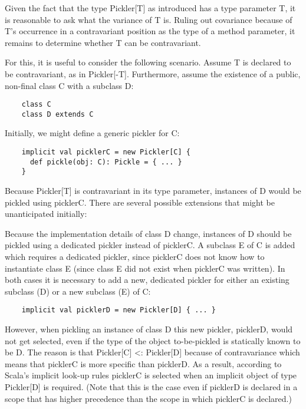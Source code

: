 \documentclass[preprint,10pt]{sigplanconf}
\theoremstyle{definition}
\begin{document}
Given the fact that the type Pickler[T] as introduced has a type parameter T, it is reasonable to ask what the variance of T is. Ruling out covariance because of T's occurrence in a contravariant position as the type of a method parameter, it remains to determine whether T can be contravariant.

For this, it is useful to consider the following scenario. Assume T is declared to be contravariant, as in Pickler[-T]. Furthermore, assume the existence of a public, non-final class C with a subclass D:

\begin{verbatim}
    class C
    class D extends C
\end{verbatim}

Initially, we might define a generic pickler for C:

\begin{verbatim}
    implicit val picklerC = new Pickler[C] {
      def pickle(obj: C): Pickle = { ... }
    }
\end{verbatim}

Because Pickler[T] is contravariant in its type parameter, instances of D would be pickled using picklerC. There are several possible extensions that might be unanticipated initially:

Because the implementation details of class D change, instances of D should be pickled using a dedicated pickler instead of picklerC.
A subclass E of C is added which requires a dedicated pickler, since picklerC does not know how to instantiate class E (since class E did not exist when picklerC was written).
In both cases it is necessary to add a new, dedicated pickler for either an existing subclass (D) or a new subclass (E) of C:

\begin{verbatim}
    implicit val picklerD = new Pickler[D] { ... }
\end{verbatim}

However, when pickling an instance of class D this new pickler, picklerD, would not get selected, even if the type of the object to-be-pickled is statically known to be D. The reason is that Pickler[C] <: Pickler[D] because of contravariance which means that picklerC is more specific than picklerD. As a result, according to Scala's implicit look-up rules picklerC is selected when an implicit object of type Pickler[D] is required. (Note that this is the case even if picklerD is declared in a scope that has higher precedence than the scope in which picklerC is declared.)
\end{document}
